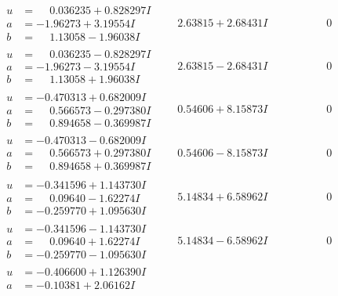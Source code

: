 \documentclass[1p]{elsarticle_modified}
\theoremstyle{definition}
\begin{document}
$$\begin{array}{c|c|c}
 \hline 
\begin{aligned}
u &= \phantom{-}0.036235 + 0.828297 I \\
a &= -1.96273 + 3.19554 I \\
b &= \phantom{-}1.13058 - 1.96038 I\end{aligned}
 & \phantom{-}2.63815 + 2.68431 I & \phantom{-0.000000 } 0 \\ \hline\begin{aligned}
u &= \phantom{-}0.036235 - 0.828297 I \\
a &= -1.96273 - 3.19554 I \\
b &= \phantom{-}1.13058 + 1.96038 I\end{aligned}
 & \phantom{-}2.63815 - 2.68431 I & \phantom{-0.000000 } 0 \\ \hline\begin{aligned}
u &= -0.470313 + 0.682009 I \\
a &= \phantom{-}0.566573 - 0.297380 I \\
b &= \phantom{-}0.894658 - 0.369987 I\end{aligned}
 & \phantom{-}0.54606 + 8.15873 I & \phantom{-0.000000 } 0 \\ \hline\begin{aligned}
u &= -0.470313 - 0.682009 I \\
a &= \phantom{-}0.566573 + 0.297380 I \\
b &= \phantom{-}0.894658 + 0.369987 I\end{aligned}
 & \phantom{-}0.54606 - 8.15873 I & \phantom{-0.000000 } 0 \\ \hline\begin{aligned}
u &= -0.341596 + 1.143730 I \\
a &= \phantom{-}0.09640 - 1.62274 I \\
b &= -0.259770 + 1.095630 I\end{aligned}
 & \phantom{-}5.14834 + 6.58962 I & \phantom{-0.000000 } 0 \\ \hline\begin{aligned}
u &= -0.341596 - 1.143730 I \\
a &= \phantom{-}0.09640 + 1.62274 I \\
b &= -0.259770 - 1.095630 I\end{aligned}
 & \phantom{-}5.14834 - 6.58962 I & \phantom{-0.000000 } 0 \\ \hline\begin{aligned}
u &= -0.406600 + 1.126390 I \\
a &= -0.10381 + 2.06162 I \\

\end{aligned}
\end{array}$$
\end{document}
